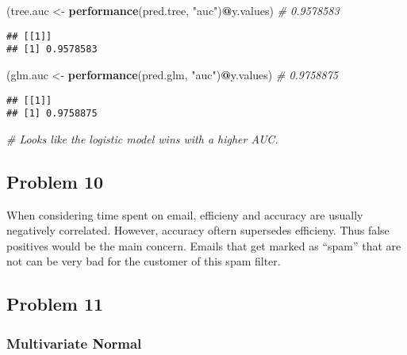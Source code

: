 \documentclass[]{article}
\newenvironment{Shaded}{\begin{snugshade}}{\end{snugshade}}
\newcommand{\CommentTok}[1]{\textcolor[rgb]{0.56,0.35,0.01}{\textit{#1}}}
\newcommand{\KeywordTok}[1]{\textcolor[rgb]{0.13,0.29,0.53}{\textbf{#1}}}
\newcommand{\NormalTok}[1]{#1}
\newcommand{\OperatorTok}[1]{\textcolor[rgb]{0.81,0.36,0.00}{\textbf{#1}}}
\newcommand{\StringTok}[1]{\textcolor[rgb]{0.31,0.60,0.02}{#1}}
\begin{document}
\begin{Shaded}
\begin{Highlighting}[]
\NormalTok{(tree.auc <-}\StringTok{ }\KeywordTok{performance}\NormalTok{(pred.tree, }\StringTok{"auc"}\NormalTok{)}\OperatorTok{@}\NormalTok{y.values) }\CommentTok{# 0.9578583}
\end{Highlighting}
\end{Shaded}

\begin{verbatim}
## [[1]]
## [1] 0.9578583
\end{verbatim}

\begin{Shaded}
\begin{Highlighting}[]
\NormalTok{(glm.auc <-}\StringTok{ }\KeywordTok{performance}\NormalTok{(pred.glm, }\StringTok{"auc"}\NormalTok{)}\OperatorTok{@}\NormalTok{y.values) }\CommentTok{# 0.9758875}
\end{Highlighting}
\end{Shaded}

\begin{verbatim}
## [[1]]
## [1] 0.9758875
\end{verbatim}

\begin{Shaded}
\begin{Highlighting}[]
\CommentTok{# Looks like the logistic model wins with a higher AUC. }
\end{Highlighting}
\end{Shaded}

\hypertarget{problem-10}{%
\subsection{Problem 10}\label{problem-10}}

When considering time spent on email, efficieny and accuracy are usually
negatively correlated. However, accuracy oftern supersedes efficieny.
Thus false positives would be the main concern. Emails that get marked
as ``spam'' that are not can be very bad for the customer of this spam
filter.

\hypertarget{problem-11}{%
\subsection{Problem 11}\label{problem-11}}

\hypertarget{multivariate-normal}{%
\subsubsection{Multivariate Normal}\label{multivariate-normal}}
\end{document}
